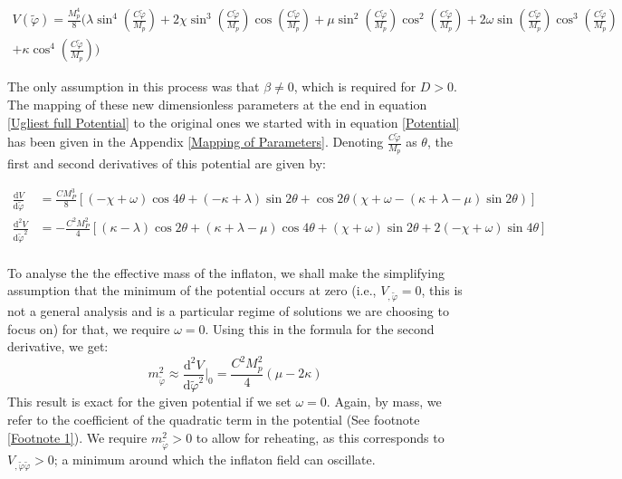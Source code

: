 \documentclass[aps,prd,reprint,preprintnumbers,showpacs,floatfix,nofootinbib,superscript address]{revtex4-2}
\begin{document}
\begin{widetext}
    \begin{equation} 
    \begin{aligned} \label{Ugliest full Potential}
        V(\tilde{\varphi}) =  \frac{M_p^4}{8} \Bigg(\lambda \sin^4\left( \frac{C \tilde{\varphi}}{M_p}\right) + 2 \chi \sin^3\left( \frac{C \tilde{\varphi}}{M_p}\right) \cos\left( \frac{C \tilde{\varphi}}{M_p}\right)  + \mu \sin^2\left( \frac{C \tilde{\varphi}}{M_p}\right) \cos^2\left( \frac{C \tilde{\varphi}}{M_p}\right) + 2\omega \sin\left( \frac{C \tilde{\varphi}}{M_p}\right) \cos^3\left( \frac{C \tilde{\varphi}}{M_p}\right)  \\ + \kappa \cos^4\left( \frac{C \tilde{\varphi}}{M_p}\right) \Bigg)
    \end{aligned}
\end{equation}
\end{widetext}
The only assumption in this process was that $\beta \neq 0$, which is required for $D > 0$. The mapping of these new dimensionless parameters at the end in equation \ref{Ugliest full Potential} to the original ones we started with in equation \ref{Potential} has been given in the Appendix \ref{Mapping of Parameters}. Denoting $\frac{C\tilde{\varphi}}{M_p}$ as $\theta$, the first and second derivatives of this potential are given by:
\begin{widetext}
    \begin{equation} 
    \begin{aligned} \label{Derivatives of Pot}
    \frac{\text{d}V}{\text{d}\tilde{\varphi}} &= \frac{CM_P^3}{8} \left[ (-\chi + \omega) \cos4\theta + (-\kappa + \lambda) \sin2\theta + \cos2\theta (\chi + \omega - (\kappa + \lambda - \mu ) 
    \sin2\theta) \right] \nonumber \\
    \frac{\text{d}^2V}{\text{d}\tilde{\varphi}^2} &= -\frac{C^2M_P^2}{4} \left[ (\kappa - \lambda) \cos2\theta + (\kappa + \lambda - \mu) \cos4\theta + (\chi+\omega) \sin2\theta + 2(-\chi + \omega) \sin4\theta \right]  \\
    \end{aligned}
\end{equation}
\end{widetext}
To analyse the the effective mass of the inflaton, we shall make the simplifying assumption that the minimum of the potential occurs at zero (i.e., $V_{,\tilde{\varphi}} = 0$, this is not a general analysis and is a particular regime of solutions we are choosing to focus on) for that, we require $\omega = 0$.
Using this in the formula for the second derivative, we get:
\begin{equation}
    m_{\tilde{\varphi}}^2 \approx  \frac{\text{d}^2V}{\text{d}\tilde{\varphi}^2} \Bigg|_0 = \frac{C^2M_p^2}{4}(  \mu - 2\kappa)
\end{equation}
This result is exact for the given potential if we set $\omega = 0$. Again, by mass, we refer to the coefficient of the quadratic term in the potential (See footnote \ref{Footnote 1}). We require $m_{\tilde{\varphi}}^2 > 0$ to allow for reheating, as this corresponds to $V_{,\tilde{\varphi}\tilde{\varphi}} > 0$; a minimum around which the inflaton field can oscillate.
\end{document}
